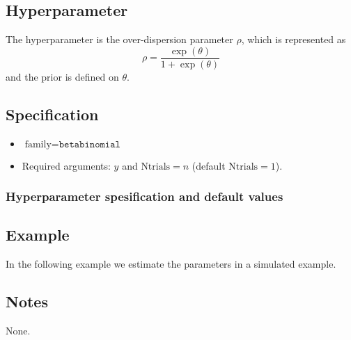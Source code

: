 \documentclass[a4paper,11pt]{article}
\begin{document}
\subsection*{Hyperparameter}

The hyperparameter is the over-dispersion parameter $\rho$, which is
represented as
\begin{displaymath}
    \rho = \frac{\exp(\theta)}{1+\exp(\theta)}
\end{displaymath}
and the prior is defined on $\theta$. 

\subsection*{Specification}

\begin{itemize}
\item $\text{family}=\texttt{betabinomial}$
\item Required arguments: $y$ and $\text{Ntrials} = n$ (default
    $\text{Ntrials}=1$).
\end{itemize}

\subsubsection*{Hyperparameter spesification and default values}



\subsection*{Example}

In the following example we estimate the parameters in a simulated
example.


\subsection*{Notes}

None.
\end{document}
